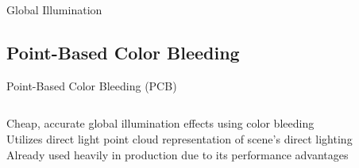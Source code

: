 \documentclass[10pt,compress,professionalfont]{beamer}
\begin{document}
\begin{frame}{Global Illumination}
\end{frame}




\subsection{Point-Based Color Bleeding}
\begin{frame}{Point-Based Color Bleeding (PCB)}


    \begin{columns}
        \begin{column}{0.65\textwidth}
            Cheap, accurate global illumination effects using color bleeding\\
            \vspace{8mm}
            Utilizes direct light point cloud representation of scene's direct lighting\\
            \vspace{8mm}
            Already used heavily in production due to its performance advantages


\end{column}
\end{columns}
\end{frame}
\end{document}
